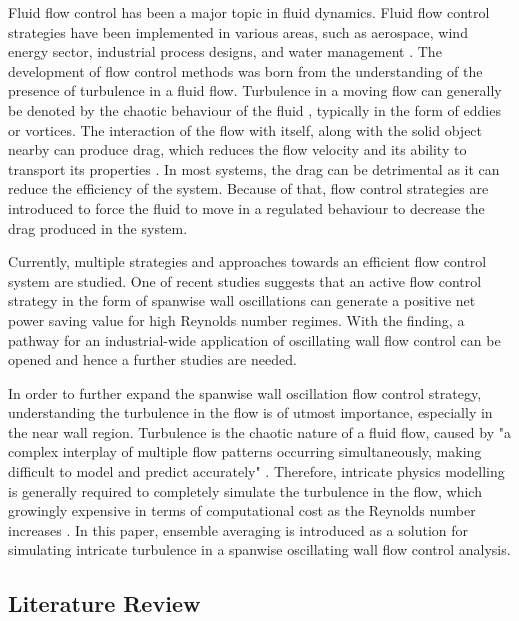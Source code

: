 Fluid flow control has been a major topic in fluid dynamics. Fluid flow control strategies have been implemented in various areas, such as aerospace, wind energy sector, industrial process designs, and water management \cite{Airiau2016}. The development of flow control methods was born from the understanding of the presence of turbulence in a fluid flow. Turbulence in a moving flow can generally be denoted by the chaotic behaviour of the fluid \cite{Benzi2023}, typically in the form of eddies or vortices. The interaction of the flow with itself, along with the solid object nearby can produce drag, which reduces the flow velocity and its ability to transport its properties \cite{Bell1979}. In most systems, the drag can be detrimental as it can reduce the efficiency of the system. Because of that, flow control strategies are introduced to force the fluid to move in a regulated behaviour to decrease the drag produced in the system. 

Currently, multiple strategies and approaches towards an efficient flow control system are studied. One of recent studies \cite{Marusic2021} suggests that an active flow control strategy in the form of spanwise wall oscillations can generate a positive net power saving value for high Reynolds number regimes. With the finding, a pathway for an industrial-wide application of oscillating wall flow control can be opened and hence a further studies are needed.

In order to further expand the spanwise wall oscillation flow control strategy, understanding the turbulence in the flow is of utmost importance, especially in the near wall region. Turbulence is the chaotic nature of a fluid flow, caused by "a complex interplay of multiple flow patterns occurring simultaneously, making difficult to model and predict accurately" \cite{Alberti2023}. Therefore, intricate physics modelling is generally required to completely simulate the turbulence in the flow, which growingly expensive in terms of computational cost as the Reynolds number increases \cite{Chen2021}. In this paper, ensemble averaging is introduced as a solution for simulating intricate turbulence in a spanwise oscillating wall flow control analysis.



\subsection{Literature  Review}

